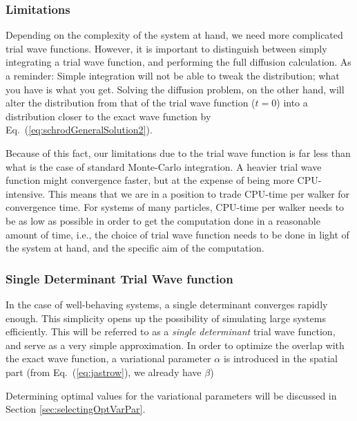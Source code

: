 \subsubsection{Limitations}

Depending on the complexity of the system at hand, we need more complicated trial wave functions. However, it is important to distinguish between simply integrating a trial wave function, and performing the full diffusion calculation. As a reminder: Simple integration will not be able to tweak the distribution; what you have is what you get. Solving the diffusion problem, on the other hand, will alter the distribution from that of the trial wave function ($t = 0$) into a distribution closer to the exact wave function by Eq.~(\ref{eq:schrodGeneralSolution2}). 

Because of this fact, our limitations due to the trial wave function is far less than what is the case of standard Monte-Carlo integration. A heavier trial wave function might convergence faster, but at the expense of being more CPU-intensive. This means that we are in a position to trade CPU-time per walker for convergence time. For systems of many particles, CPU-time per walker needs to be as low as possible in order to get the computation done in a reasonable amount of time, i.e., the choice of trial wave function needs to be done in light of the system at hand, and the specific aim of the computation. 

\subsubsection{Single Determinant Trial Wave function}

In the case of well-behaving systems, a single determinant converges rapidly enough. This simplicity opens up the possibility of simulating large systems efficiently. This will be referred to as a \textit{single determinant} trial wave function, and serve as a  very simple approximation. In order to optimize the overlap with the exact wave function, a variational parameter $\alpha$ is introduced in the spatial part (from  Eq.~(\ref{eq:jastrow}), we already have $\beta$)


Determining optimal values for the variational parameters will be discussed in Section \ref{sec:selectingOptVarPar}.

